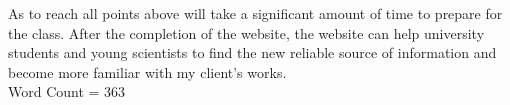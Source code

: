 \documentclass[a4paper]{article}
\begin{document}
As to reach all points above will take a significant amount of time to prepare for the class. After the completion of the website, the website can help university students and young scientists to find the new reliable source of information and become more familiar with my client's works.\\

Word Count = 363\\
\end{document}
